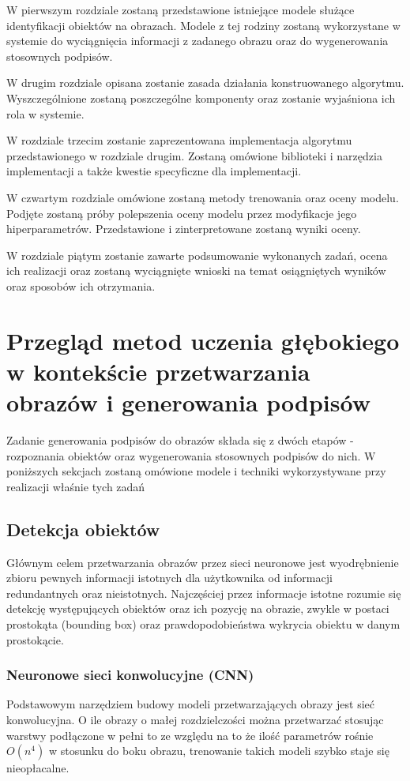 W pierwszym rozdziale zostaną przedstawione istniejące modele służące identyfikacji obiektów na obrazach. Modele z tej rodziny zostaną wykorzystane w systemie do wyciągnięcia informacji z zadanego obrazu oraz do wygenerowania stosownych podpisów. \par
W drugim rozdziale opisana zostanie zasada działania konstruowanego algorytmu. Wyszczególnione zostaną poszczególne komponenty oraz zostanie wyjaśniona ich rola w systemie. \par
W rozdziale trzecim zostanie zaprezentowana implementacja algorytmu przedstawionego w rozdziale drugim. Zostaną omówione biblioteki i narzędzia implementacji a także kwestie specyficzne dla implementacji. \par
W czwartym rozdziale omówione zostaną metody trenowania oraz oceny modelu. Podjęte zostaną próby polepszenia oceny modelu przez modyfikacje jego hiperparametrów. Przedstawione i zinterpretowane zostaną wyniki oceny. \par
W rozdziale piątym zostanie zawarte podsumowanie wykonanych zadań, ocena ich realizacji oraz zostaną wyciągnięte wnioski na temat osiągniętych wyników oraz sposobów ich otrzymania.

\newpage 
 
\section{Przegląd metod uczenia głębokiego w kontekście przetwarzania obrazów i generowania podpisów}
Zadanie generowania podpisów do obrazów składa się z dwóch etapów - rozpoznania obiektów oraz wygenerowania stosownych podpisów do nich. W poniższych sekcjach zostaną omówione modele i techniki wykorzystywane przy realizacji właśnie tych zadań
\subsection{Detekcja obiektów}
Głównym celem przetwarzania obrazów przez sieci neuronowe jest wyodrębnienie zbioru pewnych informacji istotnych dla użytkownika od informacji redundantnych oraz nieistotnych. Najczęściej przez informacje istotne rozumie się detekcję występujących obiektów oraz ich pozycję na obrazie, zwykle w postaci prostokąta (bounding box) oraz prawdopodobieństwa wykrycia obiektu w danym prostokącie.
\subsubsection{Neuronowe sieci konwolucyjne (CNN)}
Podstawowym narzędziem budowy modeli przetwarzających obrazy jest sieć konwolucyjna. O ile obrazy o małej rozdzielczości można przetwarzać stosując warstwy podłączone w pełni to ze względu na to że ilość parametrów rośnie $O(n^4)$ w stosunku do boku obrazu, trenowanie takich modeli szybko staje się nieopłacalne.

